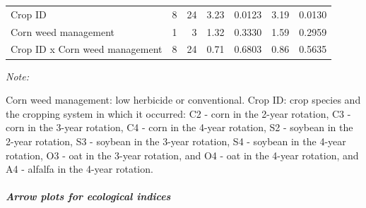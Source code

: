\documentclass[
]{article}
\begin{document}
\begin{table}
\begin{threeparttable}
\begin{tabular}[t]{lrrr>{}r|rr}
\hspace{1em}Crop ID & 8 & 24 & 3.23 & 0.0123 & 3.19 & 0.0130\\
\hspace{1em}Corn weed management & 1 & 3 & 1.32 & 0.3330 & 1.59 & 0.2959\\
\hspace{1em}Crop ID x Corn weed management & 8 & 24 & 0.71 & 0.6803 & 0.86 & 0.5635\\
\bottomrule
\end{tabular}
\begin{tablenotes}[para]
\item \textit{Note: } 
\item Corn weed management: low herbicide or conventional. Crop ID: crop species and the cropping system in which it occurred: C2 - corn in the 2-year rotation, C3 - corn in the 3-year rotation, C4 - corn in the 4-year rotation, S2 - soybean in the 2-year rotation, S3 - soybean in the 3-year rotation, S4 - soybean in the 4-year rotation, O3 - oat in the 3-year rotation, and O4 - oat in the 4-year rotation, and A4 - alfalfa in the 4-year rotation.
\end{tablenotes}
\end{threeparttable}
\end{table}

\subparagraph{Arrow plots for ecological indices}\label{arrow-plots-for-ecological-indices}
\end{document}
